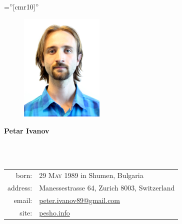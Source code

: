 \documentclass[a4paper,10pt]{article}
\def\name{Petar Ivanov}
\newcommand{\minorcolor}[1]{\textcolor{mygray}{#1}}
\begin{document}
\pagestyle{empty}                               %
\font\fb=''[cmr10]''                            %


\begin{figure}
          \vspace{-40pt}\includegraphics[width=40mm]{PetarIvanov2015.jpg}
\end{figure}

\par{\raggedright\Huge\textbf{\vspace{-3mm}\hspace{0mm}\name}}\\        %
\vspace{-5mm}{\color{linegray}\rule{10.5cm}{0.1mm}}\\

\hspace{4mm}\begin{tabular}{rl}
        \minorcolor{born:} & \textsc{29 May 1989} in Shumen, Bulgaria\\
        \minorcolor{address:} & Manessestrasse \textsc{64}, Zurich \textsc{8003}, Switzerland\\
        \minorcolor{email:} & \href{mailto:peter.ivanov89@gmail.com}{peter.ivanov89@gmail.com}\\
        \minorcolor{site:} & \href{http://pesho.info}{pesho.info}\\
\end{tabular}
\bigskip
\end{document}
